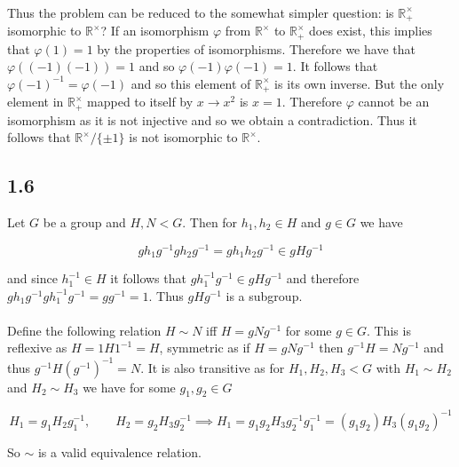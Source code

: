 \documentclass{article}
\begin{document}
\paragraph{}
Thus the problem can be reduced to the somewhat simpler question: is $\mathbb{R}^\times_+$ isomorphic 
to $\mathbb{R}^\times$? If an isomorphism $\varphi$ from $\mathbb{R}^\times$ to $\mathbb{R}^\times_+$ does exist, this implies that $\varphi(1) = 1$ 
by the properties of isomorphisms. Therefore we have that $\varphi((-1)(-1)) = 1$ and so 
$\varphi(-1)\varphi(-1) = 1$. It follows that $\varphi(-1)^{-1} = \varphi(-1)$ and so this 
element of $\mathbb{R}^\times_+$ is its own inverse. But the only element in $\mathbb{R}^\times_+$ mapped to 
itself by $x \rightarrow x^2$ is $x = 1$. Therefore $\varphi$ cannot be an isomorphism as it is 
not injective and so we obtain a contradiction. Thus it follows that $\mathbb{R}^\times/\{\pm 1\}$ is 
not isomorphic to $\mathbb{R}^\times$.



\subsection*{1.6}
Let $G$ be a group and $H,N < G$. Then for $h_1,h_2 \in H$ and $g \in G$ we have 

\begin{equation*}
	gh_1g^{-1}gh_2g^{-1} = gh_1h_2g^{-1} \in gHg^{-1}
\end{equation*}

and since $h_1^{-1} \in H$ it follows that $gh_1^{-1}g^{-1} \in gHg^{-1}$ and therefore 
$gh_1g^{-1}gh_1^{-1}g^{-1} = gg^{-1} = 1$. Thus $gHg^{-1}$ is a subgroup. 

\paragraph{}
Define the following relation $H \sim N$ iff $H = gNg^{-1}$ for some $g \in G$. 
This is reflexive as $H = 1H1^{-1} = H$, symmetric as if $H = gNg^{-1}$ then $g^{-1}H = Ng^{-1}$ 
and thus $g^{-1}H(g^{-1})^{-1} = N$. It is also transitive as for $H_1,H_2,H_3 < G$ with 
$H_1 \sim H_2$ and $H_2 \sim H_3$ we have for some $g_1, g_2 \in G$

\begin{equation*}
	H_1 = g_1H_2g_1^{-1}, \qquad H_2 = g_2H_3g_2^{-1} \implies H_1 = g_1g_2H_3g_2^{-1}g_1^{-1} = (g_1g_2)H_3(g_1g_2)^{-1}
\end{equation*}

So $\sim$ is a valid equivalence relation.
\end{document}
